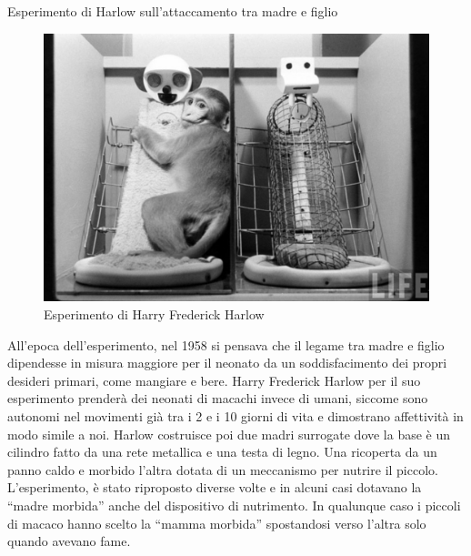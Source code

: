 \documentclass[12pt]{book} %
\begin{document}
\needspace{4cm}
\begin{mdframed}[linewidth=1pt]
Esperimento di Harlow sull'attaccamento tra madre e figlio 

\needspace{4cm}
\begin{figure}
  \centering
  \includegraphics[width=0.95\linewidth]{images/Libro-img017.jpg}
  \begin{minipage}{\linewidth}
    \caption{Esperimento di Harry Frederick Harlow}
  \end{minipage}
\end{figure}

All'epoca dell'esperimento, nel 1958 si pensava che il legame tra madre e
figlio dipendesse in misura maggiore per il neonato da un soddisfacimento dei propri desideri primari, come
mangiare e bere. Harry Frederick Harlow per il suo esperimento prenderà dei neonati di macachi invece di umani, siccome
sono autonomi nel movimenti già tra i 2 e i 10 giorni di vita e dimostrano affettività in modo simile a noi. Harlow
costruisce poi due madri surrogate dove la base è un cilindro fatto da una rete metallica e una testa di legno. Una
ricoperta da un panno caldo e morbido l'altra dotata di un meccanismo per nutrire il piccolo.
L'esperimento, è stato riproposto diverse volte e in alcuni casi dotavano la “madre morbida” anche
del dispositivo di nutrimento. In qualunque caso i piccoli di macaco hanno scelto la “mamma morbida” spostandosi
verso l'altra solo quando avevano fame.


\end{mdframed}
\end{document}
